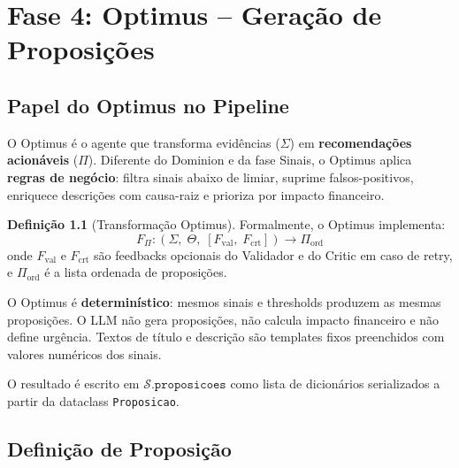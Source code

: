\documentclass[a4paper, 12pt]{report}
\theoremstyle{definition}
\newtheorem{definicao}{Defini\c{c}\~ao}[chapter]
\theoremstyle{remark}
\newcommand{\state}{\mathcal{S}}
\begin{document}
\chapter{Fase 4: Optimus -- Gera\c{c}\~ao de Proposi\c{c}\~oes}

\section{Papel do Optimus no Pipeline}

O Optimus \'e o agente que transforma evid\^encias ($\Sigma$) em
\textbf{recomenda\c{c}\~oes acion\'aveis} ($\Pi$). Diferente do Dominion
e da fase Sinais, o Optimus aplica \textbf{regras de neg\'ocio}:
filtra sinais abaixo de limiar, suprime falsos-positivos, enriquece
descri\c{c}\~oes com causa-raiz e prioriza por impacto financeiro.

\begin{definicao}[Transforma\c{c}\~ao Optimus]
  Formalmente, o Optimus implementa:
  \[
    F_{\Pi} : (\Sigma,\; \Theta,\; [F_{\text{val}},\; F_{\text{crt}}]) \to \Pi_{\text{ord}}
  \]
  onde $F_{\text{val}}$ e $F_{\text{crt}}$ s\~ao feedbacks opcionais do
  Validador e do Critic em caso de retry, e $\Pi_{\text{ord}}$ \'e a lista
  ordenada de proposi\c{c}\~oes.
\end{definicao}

\begin{caixadecisao}
  O Optimus \'e \textbf{determin\'istico}: mesmos sinais e thresholds
  produzem as mesmas proposi\c{c}\~oes. O LLM n\~ao gera proposi\c{c}\~oes,
  n\~ao calcula impacto financeiro e n\~ao define urg\^encia.
  Textos de t\'itulo e descri\c{c}\~ao s\~ao templates fixos preenchidos
  com valores num\'ericos dos sinais.
\end{caixadecisao}

O resultado \'e escrito em $\state.\texttt{proposicoes}$ como lista de
dicion\'arios serializados a partir da dataclass \texttt{Proposicao}.


\section{Defini\c{c}\~ao de Proposi\c{c}\~ao}
\end{document}
